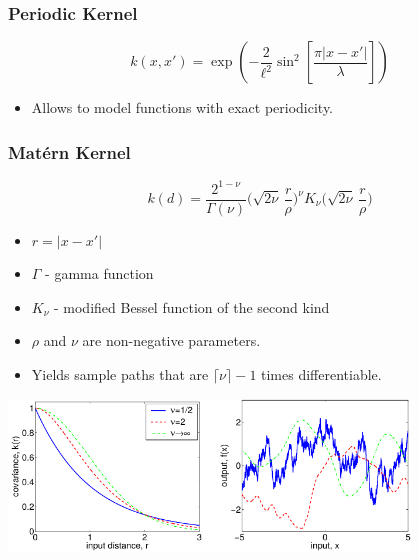 \begin{frame} \frametitle{Periodic Kernel}
\begin{equation}
  k(x,x') = \exp\left(-\frac{2}{\ell^2}\sin^2\left[\frac{\pi|x - x'|}{\lambda}\right]\right)
\end{equation}
\begin{itemize}
  \item Allows to model functions with exact periodicity.
\end{itemize}
\end{frame}

\begin{frame} \frametitle{Mat\'ern Kernel}
\vspace{-3mm}
\begin{equation}
  k(d) = \frac{2^{1-\nu}}{\Gamma(\nu)}\Bigg(\sqrt{2\nu}\,\frac{r}{\rho}\Bigg)^\nu
    K_\nu\Bigg(\sqrt{2\nu}\,\frac{r}{\rho}\Bigg)
\end{equation}
\vspace{-3mm}
\begin{itemize}
  \item $r = |x-x'|$
  \item $\Gamma$ - gamma function
  \item $K_\nu$ - modified Bessel function of the second kind
  \item $\rho$ and $\nu$ are non-negative parameters.
  \item Yields sample paths that are $\lceil\nu\rceil - 1$ times differentiable.
\end{itemize}
\begin{center}
\includegraphics[width=0.8\textwidth]{matern}
\end{center}
\end{frame}

